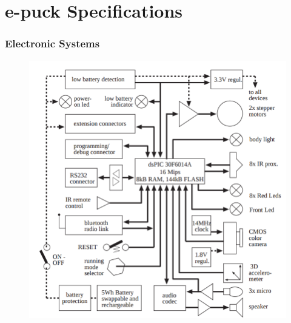 \documentclass[a4paper,12pt]{report}
\begin{document}
\chapter{e-puck Specifications}

\subsection{Electronic Systems}

\begin{figure}[!h]
	\begin{minipage}{.75\textwidth}
		\centering
		\includegraphics[width=1\linewidth]{electronics.png}
		\label{fig:epuck-elec}
	\end{minipage}
\end{figure}

\clearpage
\end{document}
